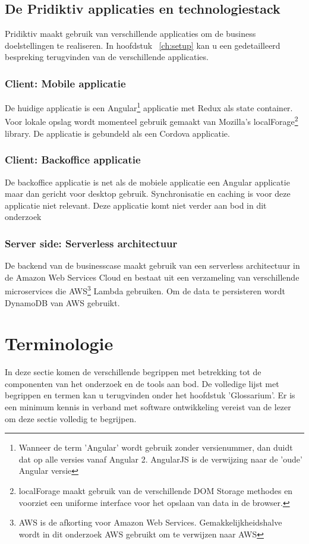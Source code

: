 \subsection{De Pridiktiv applicaties en technologiestack}
Pridiktiv maakt gebruik van verschillende applicaties om de business doelstellingen te realiseren. In hoofdstuk ~\ref{ch:setup} kan u een gedetailleerd bespreking terugvinden van de verschillende applicaties.
\subsubsection{Client: Mobile applicatie}
De huidige applicatie is een Angular\footnote{Wanneer de term 'Angular' wordt gebruik zonder versienummer, dan duidt dat op alle versies vanaf Angular 2. AngularJS is de verwijzing naar de 'oude' Angular versie} applicatie met Redux als state container. Voor lokale opslag wordt momenteel gebruik gemaakt van Mozilla's localForage\footnote{localForage maakt gebruik van de verschillende DOM Storage methodes en voorziet een uniforme interface voor het opslaan van data in de browser.} library. De applicatie is gebundeld als een Cordova applicatie.
\subsubsection{Client: Backoffice applicatie}
De backoffice applicatie is net als de mobiele applicatie een Angular applicatie maar dan gericht voor desktop gebruik. Synchronisatie en caching is voor deze applicatie niet relevant. Deze applicatie komt niet verder aan bod in dit onderzoek
\clearpage
\subsubsection{Server side: Serverless architectuur}
De backend van de businesscase maakt gebruik van een serverless architectuur in de Amazon Web Services Cloud en bestaat uit een verzameling van verschillende microservices die AWS\footnote{AWS is de afkorting voor Amazon Web Services. Gemakkelijkheidshalve wordt in dit onderzoek AWS gebruikt om te verwijzen naar AWS} Lambda gebruiken. Om de data te persisteren wordt DynamoDB van AWS gebruikt.
\section{Terminologie}
\label{sec:terminologie}
In deze sectie komen de verschillende begrippen met betrekking tot de componenten van het onderzoek en de tools aan bod. De volledige lijst met begrippen en termen kan u terugvinden onder het hoofdstuk 'Glossarium'. Er is een minimum kennis in verband met software ontwikkeling vereist van de lezer om deze sectie volledig te begrijpen.
